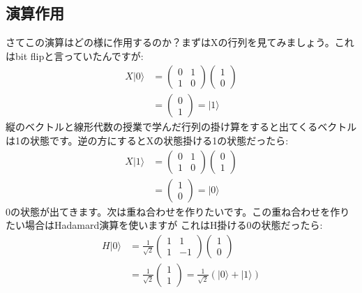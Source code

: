 \subsection{演算作用}
さてこの演算はどの様に作用するのか？まずはXの行列を見てみましょう。これはbit flipと言っていたんですが:
\begin{equation}
\begin{aligned}
X|0\rangle &=\left(\begin{array}{ll}
0 & 1 \\
1 & 0
\end{array}\right)\left(\begin{array}{l}
1 \\
0
\end{array}\right) \\
&=\left(\begin{array}{l}
0 \\
1
\end{array}\right)=|1\rangle
\end{aligned}
\end{equation}
縦のベクトルと線形代数の授業で学んだ行列の掛け算をすると出てくるベクトルは1の状態です。逆の方にするとXの状態掛ける1の状態だったら:
\begin{equation}
\begin{aligned}
X|1\rangle &=\left(\begin{array}{ll}
0 & 1 \\
1 & 0
\end{array}\right)\left(\begin{array}{l}
0 \\
1
\end{array}\right) \\
&=\left(\begin{array}{l}
1 \\
0
\end{array}\right)=|0\rangle
\end{aligned}
\end{equation}
0の状態が出てきます。次は重ね合わせを作りたいです。この重ね合わせを作りたい場合はHadamard演算を使いますが
これはH掛ける0の状態だったら:
\begin{equation}
\begin{aligned}
H|0\rangle &=\frac{1}{\sqrt{2}}\left(\begin{array}{cc}
1 & 1 \\
1 & -1
\end{array}\right)\left(\begin{array}{l}
1 \\
0
\end{array}\right) \\
&=\frac{1}{\sqrt{2}}\left(\begin{array}{l}
1 \\
1
\end{array}\right)=\frac{1}{\sqrt{2}}(|0\rangle+|1\rangle)
\end{aligned}
\end{equation}

